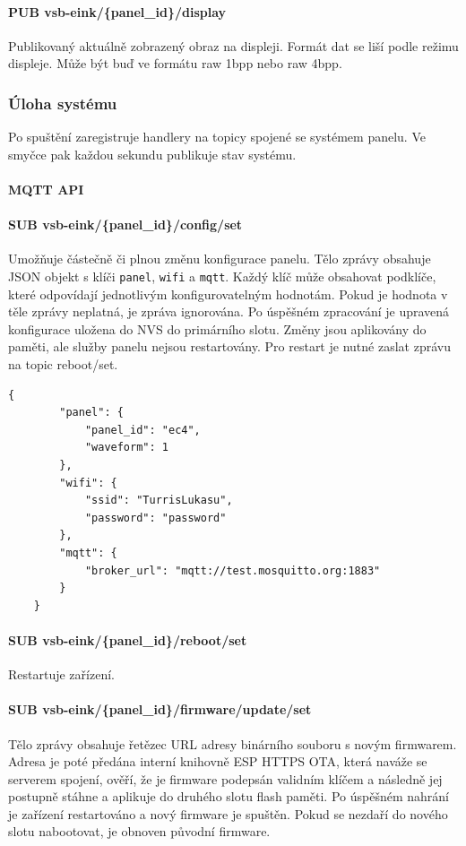 \paragraph*{PUB vsb-eink/\{panel\_id\}/display}
Publikovaný aktuálně zobrazený obraz na displeji. Formát dat se liší podle režimu displeje. Může být buď ve formátu raw 1bpp nebo raw 4bpp.

\subsubsection{Úloha systému}
Po spuštění zaregistruje handlery na topicy spojené se systémem panelu. Ve smyčce pak každou sekundu publikuje stav systému.

\paragraph{MQTT API}
\paragraph*{SUB vsb-eink/\{panel\_id\}/config/set}
Umožňuje částečně či plnou změnu konfigurace panelu. Tělo zprávy obsahuje JSON objekt s klíči \verb|panel|, \verb|wifi| a \verb|mqtt|. Každý klíč může obsahovat podklíče, které odpovídají jednotlivým konfigurovatelným hodnotám. Pokud je hodnota v těle zprávy neplatná, je zpráva ignorována. Po úspěšném zpracování je upravená konfigurace uložena do NVS do primárního slotu. Změny jsou aplikovány do paměti, ale služby panelu nejsou restartovány. Pro restart je nutné zaslat zprávu na topic reboot/set.

\begin{lstlisting}[label=src:example-config-set,caption={Ukázka změny konfigurace všech dostupných hodnot}]
    {
        "panel": {
            "panel_id": "ec4",
            "waveform": 1
        },
        "wifi": {
            "ssid": "TurrisLukasu",
            "password": "password"
        },
        "mqtt": {
            "broker_url": "mqtt://test.mosquitto.org:1883"
        }
    }
\end{lstlisting}

\paragraph*{SUB vsb-eink/\{panel\_id\}/reboot/set}
Restartuje zařízení.

\paragraph*{SUB vsb-eink/\{panel\_id\}/firmware/update/set}
Tělo zprávy obsahuje řetězec URL adresy binárního souboru s novým firmwarem. Adresa je poté předána interní knihovně ESP HTTPS OTA, která naváže se serverem spojení, ověří, že je firmware podepsán validním klíčem a následně jej postupně stáhne a aplikuje do druhého slotu flash paměti. Po úspěšném nahrání je zařízení restartováno a nový firmware je spuštěn. Pokud se nezdaří do nového slotu nabootovat, je obnoven původní firmware.

